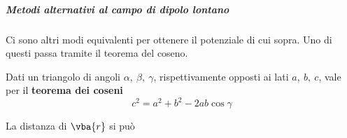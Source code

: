 
\subparagraph{Metodi alternativi al campo di dipolo lontano}
Ci sono altri modi equivalenti per ottenere il potenziale di cui sopra. Uno di questi passa tramite il teorema del coseno. 
\begin{remember}
	Dati un triangolo di angoli $\alpha,\ \beta,\ \gamma$, rispettivamente opposti ai lati $a,\ b,\ c$, vale per il \textbf{teorema dei coseni}
	\begin{equation}
		c^2=a^2+b^2-2ab\cos \gamma
	\end{equation}
\end{remember}
La distanza di $\vba{r}$ si può


\begin{comment}
	\subsection{Digressione sulla derivazione della legge generale di Ampère}
	Riprendiamo la legge di Ampere, per cui la circuitazione del campo magnetico nel caso stazionario è data da:
	\begin{equation*}
		\oint_\gamma \vba B\vdot d\vba s = \mu_0 i	
	\end{equation*}
	Riscrivendola opportunamente
	si ottiene una relaziona vettoriale in forma differenziale quale
	\begin{equation*}
		\grad\cross\vba B= \mu_0 \vba j
	\end{equation*}
	
	Questo era nel caso di un filo rettilineo infinito con la circuitazione calcolata su una curva qualsiasi $\gamma$. Ma perché abbiamo lavorato un filo \textit{rettilineo infinito}?\\
	Consideriamo ora un circuito qualsiasi $\gamma_2$, attraversato da un certo campo magnetico.
	Data un'altra curva $\gamma_1$ potrei calcolarmi la circuitazione del campo magnetico attraverso quest'ultimo.
	\begin{equation*}
		\oint_\gamma \vba B\vdot d\vba s
	\end{equation*}
	con $d\vba s$ lungo $\gamma_1$. Se le curve chiuse si intersecano, la circuitazione dovrà essere $\mu_0 i$ per la legge di Ampère.\\
	Parametrizzo $\gamma_1$ come $\gamma_1 \colon \vba r(\phi_1)$ e parametrizzo il circuito con un'altra curva $\gamma_2 \colon \vba r(\phi_2)$ Inoltre $d\vba s= \dv{\vba r (\phi_1)}{\phi_1} d\phi_1$.\\
	Usando la prima legge di Laplace il campo magnetico generato dal circuito calcolato nel vettore posizione $\vba r$ è
	\begin{equation*}
		\vba B (\vba r)=\frac{\mu_0 i}{4\pi}\int_{\gamma_2} d\vba{s}_2 \cross \frac{\vba r - \vba r (\phi_2)}{\abs{\vba r_ - \vba r (\phi_2)}^3}
	\end{equation*}
	

\end{comment}

